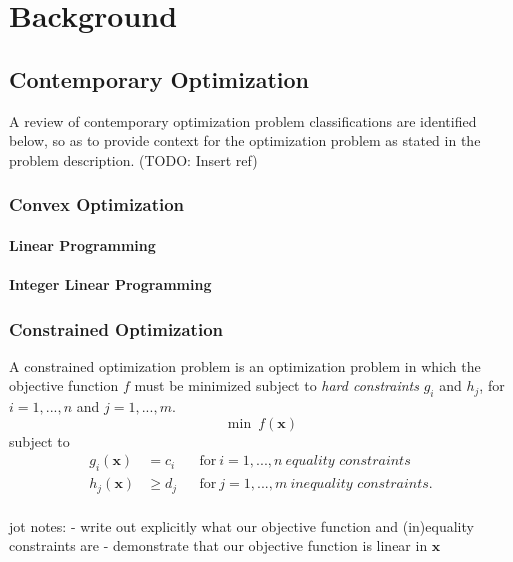 \documentclass[../mthe-493-final-project.tex]{subfiles}
\begin{document}
    \chapter{Background}
    \label{ch:background}

    \section{Contemporary Optimization}

    A review of contemporary optimization problem classifications are identified below, so as to provide context for the optimization problem as stated in the problem description. (TODO: Insert ref)

    \subsection{Convex Optimization}
    \label{ssec:Convex Optimization}

    \subsubsection{Linear Programming}
    \label{sssec:Linear Programming}

    \subsubsection{Integer Linear Programming}
    \label{sssec:Linear Programming}

    \subsection{Constrained Optimization}
    \label{ssec:Constrained Optimization}

    A constrained optimization problem is an optimization problem in which the objective function $f$ must be minimized subject to \textit{hard constraints} $g_i$ and $h_j$, for $i=1,...,n$ and $j=1,...,m$.
    \[ \min \ f(\mathbf{x}) \]
    subject to
    \begin{align*}
        g_i(\mathbf{x}) &= c_i    & &\text{for} \ i = 1,...,n \ \textit{equality constraints}    \\
        h_j(\mathbf{x}) &\geq d_j & &\text{for} \ j = 1,...,m \ \textit{inequality constraints}. \\
    \end{align*}

    jot notes:
    - write out explicitly what our objective function and (in)equality constraints are
    - demonstrate that our objective function is linear in $\mathbf{x}$
\end{document}
